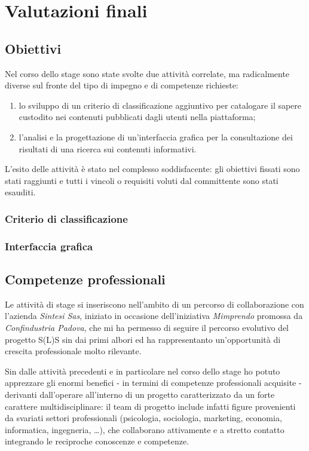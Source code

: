 \chapter{Valutazioni finali}
\label{ch:tesi:valutazioni}

\section{Obiettivi}
Nel corso dello stage sono state svolte due attività correlate, ma radicalmente diverse sul fronte del tipo di impegno e di competenze richieste:
\begin{enumerate}
  \item lo sviluppo di un criterio di classificazione aggiuntivo per catalogare il sapere custodito nei contenuti pubblicati dagli utenti nella piattaforma;
  \item l'analisi e la progettazione di un'interfaccia grafica per la consultazione dei risultati di una ricerca sui contenuti informativi.
\end{enumerate}

L'esito delle attività è stato nel complesso soddisfacente: gli obiettivi fissati sono stati raggiunti e tutti i vincoli o requisiti voluti dal committente sono stati esauditi.

\subsection{Criterio di classificazione}

\subsection{Interfaccia grafica}

\section{Competenze professionali}
Le attività di stage si inseriscono nell'ambito di un percorso di collaborazione con l'azienda \textit{Sintesi Sas}, iniziato in occasione dell'iniziativa \textit{Mimprendo} promossa da \textit{Confindustria Padova}, che mi ha permesso di seguire il percorso evolutivo del progetto S(L)S sin dai primi albori ed ha rappresentanto un'opportunità di crescita professionale molto rilevante.

Sin dalle attività precedenti e in particolare nel corso dello stage ho potuto apprezzare gli enormi benefici - in termini di competenze professionali acquisite - derivanti dall'operare all'interno di un progetto caratterizzato da un forte carattere multidisciplinare: il team di progetto include infatti figure provenienti da svariati settori professionali (psicologia, sociologia, marketing, economia, informatica, ingegneria, \ldots), che collaborano attivamente e a stretto contatto integrando le reciproche conoscenze e competenze.

